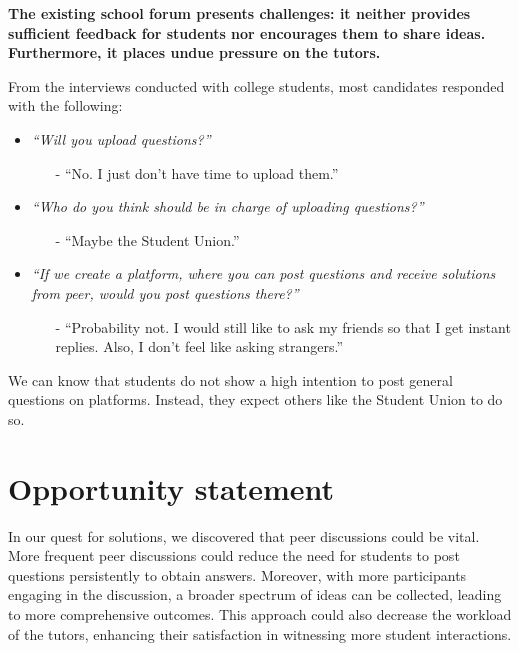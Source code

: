 \documentclass[a4paper]{article}
\begin{document}
    \textbf{The existing school forum presents challenges: it neither provides sufficient feedback for students nor encourages them to share ideas.
    Furthermore, it places undue pressure on the tutors.}

    \vspace*{1em}

    \noindent From the interviews conducted with college students, most candidates responded with the following:
    \begin{itemize}
        \item \textit{``Will you upload questions?''}
        \begin{itemize}
            \item[-] ``No. I just don't have time to upload them.''
        \end{itemize}
        \item \textit{``Who do you think should be in charge of uploading questions?''}
        \begin{itemize}
            \item[-] ``Maybe the Student Union.''
        \end{itemize}
        \item \textit{``If we create a platform, where you can post questions and receive solutions from peer, would you post questions there?''}
        \begin{itemize}
            \item[-] ``Probability not.
            I would still like to ask my friends so that I get instant replies.
            Also, I don't feel like asking strangers.''
        \end{itemize}
    \end{itemize}
    We can know that students do not show a high intention to post general questions on platforms.
    Instead, they expect others like the Student Union to do so.

    \section*{Opportunity statement}
    In our quest for solutions, we discovered that peer discussions could be vital.
    More frequent peer discussions could reduce the need for students to post questions persistently to obtain answers.
    Moreover, with more participants engaging in the discussion, a broader spectrum of ideas can be collected, leading to more comprehensive outcomes.
    This approach could also decrease the workload of the tutors, enhancing their satisfaction in witnessing more student interactions.\\
\end{document}
